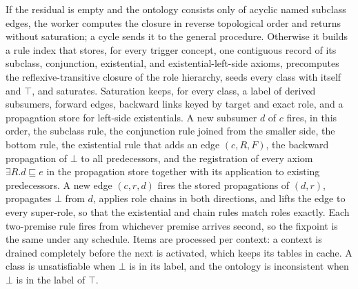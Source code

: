 If the residual is empty and the ontology consists only of acyclic named
subclass edges, the worker computes the closure in reverse topological order
\cite{kahn1962topological} and returns without saturation; a cycle sends it to
the general procedure.  Otherwise it builds a rule index that stores, for every
trigger concept, one contiguous record of its subclass, conjunction,
existential, and existential-left-side axioms, precomputes the
reflexive-transitive closure of the role hierarchy, seeds every class with
itself and $\top$, and saturates.  Saturation keeps, for every class, a label
of derived subsumers, forward edges, backward links keyed by target and exact
role, and a propagation store for left-side existentials.  A new subsumer $d$
of $c$ fires, in this order, the subclass rule, the conjunction rule joined
from the smaller side, the bottom rule, the existential rule that adds an edge
$(c,R,F)$, the backward propagation of $\bot$ to all predecessors, and the
registration of every axiom $\exists R.d\sqsubseteq e$ in the propagation store
together with its application to existing predecessors.  A new edge
$(c,r,d)$ fires the stored propagations of $(d,r)$, propagates $\bot$ from $d$,
applies role chains in both directions, and lifts the edge to every super-role,
so that the existential and chain rules match roles exactly.  Each two-premise
rule fires from whichever premise arrives second, so the fixpoint is the same
under any schedule.  Items are processed per context: a context is drained
completely before the next is activated, which keeps its tables in cache.
A class is unsatisfiable when $\bot$ is in its label, and the ontology is
inconsistent when $\bot$ is in the label of $\top$.

